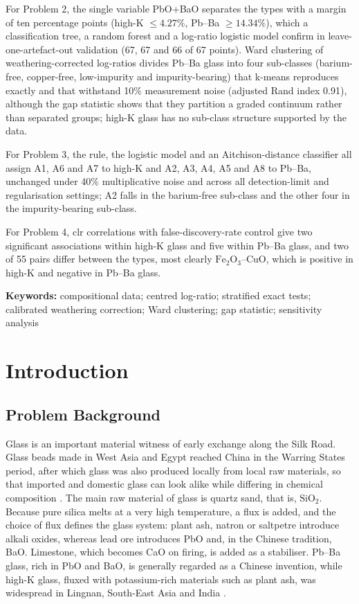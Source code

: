 \documentclass[11pt,a4paper]{article}
\newcommand{\ox}[1]{\ensuremath{\mathrm{#1}}}
\begin{document}
For Problem 2, the single variable PbO+BaO separates the types with a margin of ten percentage points (high-K $\le4.27\%$, Pb--Ba $\ge14.34\%$), which a classification tree, a random forest and a log-ratio logistic model confirm in leave-one-artefact-out validation (67, 67 and 66 of 67 points).
Ward clustering of weathering-corrected log-ratios divides Pb--Ba glass into four sub-classes (barium-free, copper-free, low-impurity and impurity-bearing) that k-means reproduces exactly and that withstand 10\% measurement noise (adjusted Rand index 0.91), although the gap statistic shows that they partition a graded continuum rather than separated groups; high-K glass has no sub-class structure supported by the data.

For Problem 3, the rule, the logistic model and an Aitchison-distance classifier all assign A1, A6 and A7 to high-K and A2, A3, A4, A5 and A8 to Pb--Ba, unchanged under 40\% multiplicative noise and across all detection-limit and regularisation settings; A2 falls in the barium-free sub-class and the other four in the impurity-bearing sub-class.

For Problem 4, clr correlations with false-discovery-rate control give two significant associations within high-K glass and five within Pb--Ba glass, and two of 55 pairs differ between the types, most clearly \ox{Fe_2O_3}--CuO, which is positive in high-K and negative in Pb--Ba glass.

\medskip
\noindent\textbf{Keywords:} compositional data; centred log-ratio; stratified exact tests; calibrated weathering correction; Ward clustering; gap statistic; sensitivity analysis

\newpage
\setcounter{tocdepth}{2}
\tableofcontents
\newpage

\section{Introduction}

\subsection{Problem Background}
Glass is an important material witness of early exchange along the Silk Road.
Glass beads made in West Asia and Egypt reached China in the Warring States period, after which glass was also produced locally from local raw materials, so that imported and domestic glass can look alike while differing in chemical composition \citep{gan2009}.
The main raw material of glass is quartz sand, that is, \ox{SiO_2}.
Because pure silica melts at a very high temperature, a flux is added, and the choice of flux defines the glass system: plant ash, natron or saltpetre introduce alkali oxides, whereas lead ore introduces PbO and, in the Chinese tradition, BaO.
Limestone, which becomes CaO on firing, is added as a stabiliser.
Pb--Ba glass, rich in PbO and BaO, is generally regarded as a Chinese invention, while high-K glass, fluxed with potassium-rich materials such as plant ash, was widespread in Lingnan, South-East Asia and India \citep{gan2009}.
\end{document}
